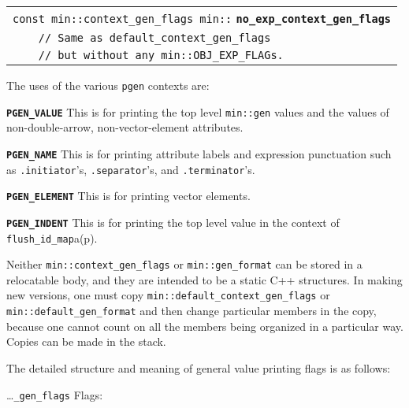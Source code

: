 \documentclass[12pt]{article}
\makeatletter
\newcommand{\TT}[1]{{\tt \bfseries #1}}
\newcommand{\ttkey}[1]{\TT{#1}\index{#1@{\tt #1}}}
\newcommand{\ttindex}[1]{\index{#1@{\tt #1}}}
\newcommand{\minindex}[1]{\ttindex{min::#1}\ttindex{#1}}
\newcommand{\pagref}[1]{p\pageref{#1}}
\newcommand{\EOL}{\penalty \exhyphenpenalty}
\newenvironment{indpar}[1][0.3in]%
	{\begin{list}{}%
		     {\setlength{\itemsep}{0in}%
		      \setlength{\topsep}{0in}%
		      \setlength{\parsep}{1ex}%
		      \setlength{\labelwidth}{#1}%
		      \setlength{\leftmargin}{#1}%
		      \addtolength{\leftmargin}{\labelsep}}%
	 \item}%
	{\end{list}}
\newenvironment{itemlist}[1][1.2in]%
	{\begin{list}{}{\setlength{\labelwidth}{#1}%
		        \setlength{\leftmargin}{\labelwidth}%
		        \addtolength{\leftmargin}{+0.2in}%
		        \renewcommand{\makelabel}[1]{##1\hfill}}}%
	{\end{list}}
\newcommand{\LABEL}[1]{\label{#1}}
\newcommand{\MINKEY}[1]{{\tt \bf #1}\minindex{#1}}
\makeatother
\begin{document}
\begin{indpar}[1em]
\begin{tabular}{l}
\verb|const min::context_gen_flags min::|%
    \MINKEY{no\_\EOL exp\_\EOL context\_\EOL gen\_\EOL flags}
\LABEL{MIN::NO_EXP_CONTEXT_GEN_FLAGS} \\
\verb|    // Same as default_context_gen_flags| \\
\verb|    // but without any min::OBJ_EXP_FLAGs.| \\
\end{tabular}
\end{indpar}

The uses of the various {\tt pgen} contexts are:

\begin{itemlist}[0.4in]

\item[\ttkey{PGEN\_VALUE}]
This is for printing the top level {\tt min::gen} values
and the values of non-double-arrow, non-vector-element attributes.

\item[\ttkey{PGEN\_NAME}]
This is for printing attribute labels and expression punctuation
such as {\tt .initiator}'s, {\tt .separator}'s, and {\tt .terminator}'s.

\item[\ttkey{PGEN\_ELEMENT}]
This is for printing vector elements.

\item[\ttkey{PGEN\_INDENT}]
\label{PGEN_INDENT}
This is for printing the top level value in the context of
{\tt flush\_\EOL id\_\EOL map}a(\pagref{MIN::FLUSH_ID_MAP}).

\end{itemlist}

Neither {\tt min::context\_\EOL gen\_\EOL flags} or
{\tt min::gen\_\EOL format} can be stored in a
relocatable body, and they are intended to be a static C++ structures.
In making new versions, one must copy
{\tt min::\EOL default\_\EOL context\_\EOL gen\_\EOL flags} or
{\tt min::\EOL default\_\EOL gen\_\EOL format}
and then change particular members in the copy, because one cannot
count on all the members being organized in a particular way.
Copies can be made in the stack.

The detailed structure and meaning of general value printing flags 
is as follows:

\ldots{\tt \_gen\_flags} Flags:
\end{document}
